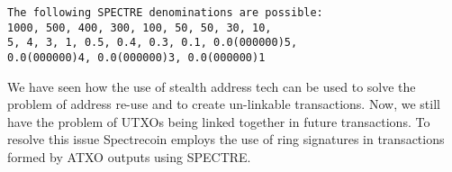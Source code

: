 \begin{lstlisting}
The following SPECTRE denominations are possible: 
1000, 500, 400, 300, 100, 50, 50, 30, 10, 
5, 4, 3, 1, 0.5, 0.4, 0.3, 0.1, 0.0(000000)5, 
0.0(000000)4, 0.0(000000)3, 0.0(000000)1
\end{lstlisting}



We have seen how the use of stealth address tech can be used to solve the
problem of address re-use and to create un-linkable transactions. Now, we
still have the problem of UTXOs being linked together in future transactions.
To resolve this issue Spectrecoin employs the use of ring signatures in
transactions formed by ATXO outputs using SPECTRE.
